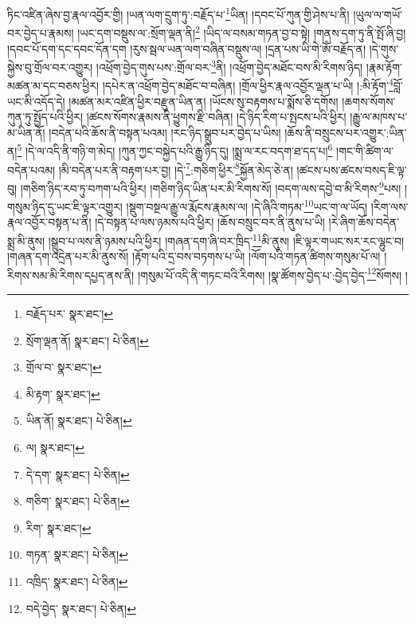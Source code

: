 ཏིང་འཛིན་ཞེས་བྱ་རྣལ་འབྱོར་གྱི། །ཡན་ལག་དྲུག་ཏུ་:བརྗོད་པ་\footnote{བརྗོད་པར་  སྣར་ཐང་། }ཡིན། །དབང་པོ་ཀུན་གྱི་ཤེས་པ་ནི། །ཡུལ་ལ་གཡོ་བར་བྱེད་པ་རྣམས། །ཡང་དག་བསྡུས་ལ་:སྲོག་ལྡན་ནི།\footnote{སྲོག་ལྡན་ནོ།  སྣར་ཐང་།  པེ་ཅིན། } །ཡིད་ལ་བསམ་གཏན་བྱ་བ་སྟེ། །གནས་དག་ཏུ་ནི་སྤོ་ཞི་བྱ། །དབང་པོ་དག་དང་དབང་དོན་དག །རུས་སྦལ་ཡན་ལག་བཞིན་བསྡུས་ལ། །དྲན་པས་ཡི་གེ་ཨོཾ་བརྗོད་ན། །དེ་གུས་སྐྱེས་བུ་གྲོལ་བར་འགྱུར། །འཕྲོག་བྱེད་གུས་པས་:གྲོལ་བར་\footnote{གྲོལ་བ་  སྣར་ཐང་། }ནི། །འཕྲོག་བྱེད་མཐོང་བས་མི་རིགས་ཉིད། །རྣམ་རྟོག་མཚན་མ་དང་བཅས་ཕྱིར། །དཔེར་ན་འཕྲོག་བྱེད་མཐོང་བ་བཞིན། །གྲོལ་ཕྱིར་རྣལ་འབྱོར་ལྡན་པ་ཡི། །:མི་རྟོག་\footnote{མི་རྟག་  སྣར་ཐང་། }བློ་ཡང་མི་འདོད་དེ། །མཚན་མར་འཛིན་ཕྱིར་བརྫུན་ཡིན་ན། །ཡོངས་སུ་བརྟགས་པ་སྨོས་ཅི་དགོས། །ཆགས་སོགས་ཀུན་ཏུ་སྤྱོད་པའི་ཕྱིར། །ཚངས་སོགས་རྣམས་ནི་ཕྱུགས་རྫི་བཞིན། །དེ་ཉིད་རིག་པ་སྤངས་པའི་ཕྱིར། །རྒྱུ་ལ་མཁས་པ་མ་ཡིན་ནོ། །བདེན་པའི་ཆོས་ནི་བསྟན་པའམ། །རང་ཉིད་སྒྲུབ་པར་བྱེད་པ་ཡིས། །ཆོས་ནི་བསྲུངས་པར་འགྱུར་:ཡིན་ན།\footnote{ཡིན་ནོ།  སྣར་ཐང་།  པེ་ཅིན། } །དེ་ལ་འདི་ནི་གཉི་ག་མེད། །ཀུན་ཀྱང་བསྐྱེད་པའི་རྒྱུ་ཉིད་དུ། །སྨྲ་ལ་རང་བདག་ཐ་དད་པ།\footnote{ལ།  སྣར་ཐང་། } །གང་གི་ཚིག་ལ་བདེན་པའམ། །མི་བདེན་པར་ནི་བརྟག་པར་བྱ། །དེ་\footnote{དེ་དག་  སྣར་ཐང་།  པེ་ཅིན། }:གཅིག་ཕྱིར་\footnote{གཅིག་  སྣར་ཐང་།  པེ་ཅིན། }སྐྱོན་མེད་ཅེ་ན། །ཚངས་པས་ཚངས་བསད་ཇི་ལྟ་བུ། །གཅིག་ཉིད་རབ་ཏུ་བཀག་པའི་ཕྱིར། །གཅིག་ཉིད་ཡིན་པར་མི་རིགས་སོ། །བདག་ལས་དབྱེ་བ་མི་རིགས་\footnote{རིག་  སྣར་ཐང་། }པས། །གསུམ་ཉིད་དུ་ཡང་ཇི་ལྟར་འགྱུར། །སྡུག་བསྔལ་རྒྱུ་ལ་རྨོངས་རྣམས་ལ། །དེ་ཞིའི་གཏམ་\footnote{གཏན་  སྣར་ཐང་།  པེ་ཅིན། }ཡང་ག་ལ་ཡོད། །རིག་ལས་རྣལ་འབྱོར་བསྟན་པ་ནི། །དེ་བསྟན་པ་ལས་ཉམས་པའི་ཕྱིར། །ཆོས་བསྲུང་བར་ནི་ནུས་པ་ཡི། །རེ་ཞིག་ཆོས་བདེན་སྨྲ་མི་ནུས། །སྒྲུབ་པ་ལས་ནི་ཉམས་པའི་ཕྱིར། །གཞན་དག་ཞི་བར་ཁྲིད་\footnote{འཁྲིད་  སྣར་ཐང་།  པེ་ཅིན། }མི་ནུས། །ཇི་ལྟར་གཡང་སར་རང་ལྷུང་བ། །གཞན་དག་འདྲེན་པར་མི་ནུས་སོ། །རྟོག་པའི་དྲ་བས་བཏགས་པ་ཡི། །ལོག་པའི་གཏན་ཚིགས་གསུམ་པོ་ལ། །རིགས་སམ་མི་རིགས་དཔྱད་ནས་ནི། །གསུམ་པོ་འདི་ནི་གཏང་བའི་རིགས། །སྣ་ཚོགས་བྱེད་པ་:བྱེད་བྱེད་\footnote{བདེ་བྱེད་  སྣར་ཐང་།  པེ་ཅིན། }སོགས། །
